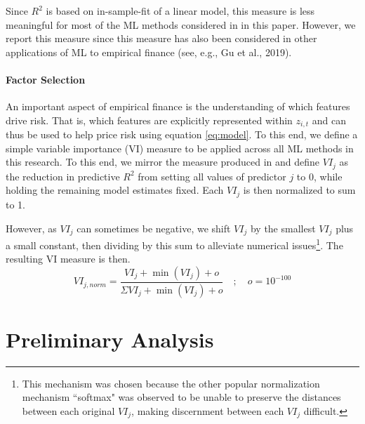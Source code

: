 \documentclass{article}
\begin{document}
Since $R^2$ is based on in-sample-fit of a linear model, this measure is less meaningful for most of the ML methods considered in in this paper. However, we report this measure since this measure has also been considered in other applications of ML to empirical finance (see, e.g., Gu et al., 2019). 
\paragraph{Factor Selection}
An important aspect of empirical finance is the understanding of which features drive risk. That is, which features are explicitly represented within $z_{i,t}$ and can thus be used to help price risk using equation \ref{eq:model}. To this end, we define a simple variable importance (VI) measure to be applied across all ML methods in this research. To this end, we mirror the measure produced in \cite{gu_empirical_2018} and define $VI_j$ as the reduction in predictive $R^2$ from setting all values of predictor $j$ to 0, while holding the remaining model estimates fixed. Each $VI_j$ is then normalized to sum to 1. 

However, as $VI_j$ can sometimes be negative, we shift $VI_j$ by the smallest $VI_j$ plus a small constant, then dividing by this sum to alleviate numerical issues\footnote{This mechanism was chosen because the other popular normalization mechanism ``softmax" was observed to be unable to preserve the distances between each original $VI_j$, making discernment between each $VI_j$ difficult.}. The resulting VI measure is then. 
\begin{equation}
VI_{j, norm} = \frac{VI_j + \operatorname{min}(VI_j) + o}
{\Sigma VI_j + \operatorname{min}(VI_j) + o} \quad ; \quad o = 10^{-100}
\end{equation}

\section{Preliminary Analysis}
\end{document}
